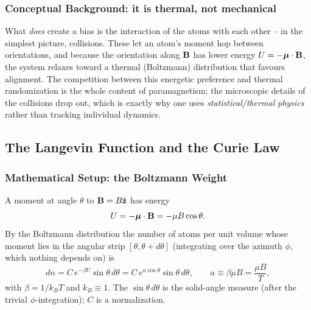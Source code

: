 \subsubsection*{Conceptual Background: it is thermal, not mechanical}
What \emph{does} create a bias is the interaction of the atoms with each other -- in the
simplest picture, collisions. These let an atom's moment hop between orientations, and
because the orientation along $\mathbf{B}$ has lower energy $U=-\boldsymbol{\mu}\cdot\mathbf{B}$, the system relaxes
toward a thermal (Boltzmann) distribution that favours alignment. The competition between
this energetic preference and thermal randomization is the whole content of paramagnetism;
the microscopic details of the collisions drop out, which is exactly why one uses
\emph{statistical/thermal physics} rather than tracking individual dynamics.


\subsection{The Langevin Function and the Curie Law}\label{subsec:lec19-curie}

\subsubsection*{Mathematical Setup: the Boltzmann Weight}
A moment at angle $\theta$ to $\mathbf{B}=B\hat{\mathbf{z}}$ has energy
\begin{equation}\label{eq:lec19-U}
  U=-\boldsymbol{\mu}\cdot\mathbf{B}=-\mu B\cos\theta .
\end{equation}
By the Boltzmann distribution the number of atoms per unit volume whose moment lies in the
angular strip $[\theta,\theta+d\theta]$ (integrating over the azimuth $\phi$, which nothing
depends on) is
\begin{equation}\label{eq:lec19-dn}
  dn=C\,e^{-\beta U}\sin\theta\,d\theta
    =C\,e^{a\cos\theta}\sin\theta\,d\theta,
  \qquad
  a\equiv\beta\mu B=\frac{\mu B}{T},
\end{equation}
with $\beta=1/k_BT$ and $k_B\equiv1$. The $\sin\theta\,d\theta$ is the solid-angle measure
(after the trivial $\phi$-integration); $C$ is a normalization.

